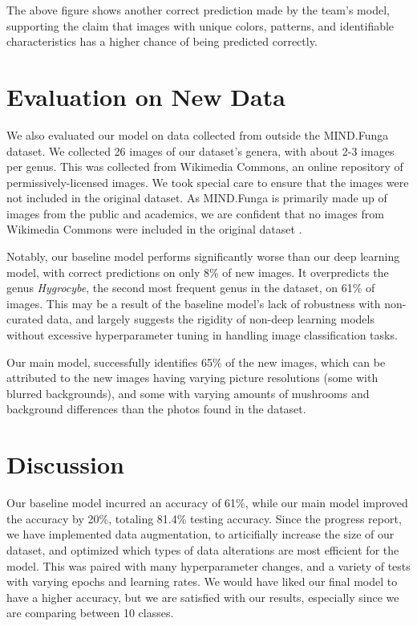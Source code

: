 \documentclass{article} %
\begin{document}
The above figure shows another correct prediction made by the team’s model, supporting the claim that images with unique colors, patterns, and identifiable characteristics has a higher chance of being predicted correctly.

\section{Evaluation on New Data}
\label{sec:evaluation}
We also evaluated our model on data collected from outside the MIND.Funga dataset. We collected 26 images of our dataset's genera, with about 2-3 images per genus. This was collected from Wikimedia Commons, an online repository of permissively-licensed images. We took special care to ensure that the images were not included in the original dataset. As MIND.Funga is primarily made up of images from the public and academics, we are confident that no images from Wikimedia Commons were included in the original dataset \citep{Drechsler-SantosKarstedtEtAl.MINDFunga.2023}.

Notably, our baseline model performs significantly worse than our deep learning model, with correct predictions on only 8\% of new images. It overpredicts the genus \textit{Hygrocybe}, the second most frequent genus in the dataset, on 61\% of images. This may be a result of the baseline model's lack of robustness with non-curated data, and largely suggests the rigidity of non-deep learning models without excessive hyperparameter tuning in handling image classification tasks.

Our main model, successfully identifies 65\% of the new images, which can be attributed to the new images having varying picture resolutions (some with blurred backgrounds), and some with varying amounts of mushrooms and background differences than the photos found in the dataset.

\section{Discussion}
\label{sec:discussion}

Our baseline model incurred an accuracy of 61\%, while our main model improved the accuracy by 20\%, totaling 81.4\% testing accuracy. Since the progress report, we have implemented data augmentation, to articifially increase the size of our dataset, and optimized which types of data alterations are most efficient for the model. This was paired with many hyperparameter changes, and a variety of tests with varying epochs and learning rates. We would have liked our final model to have a higher accuracy, but we are satisfied with our results, especially since we are comparing between 10 classes.
\end{document}

